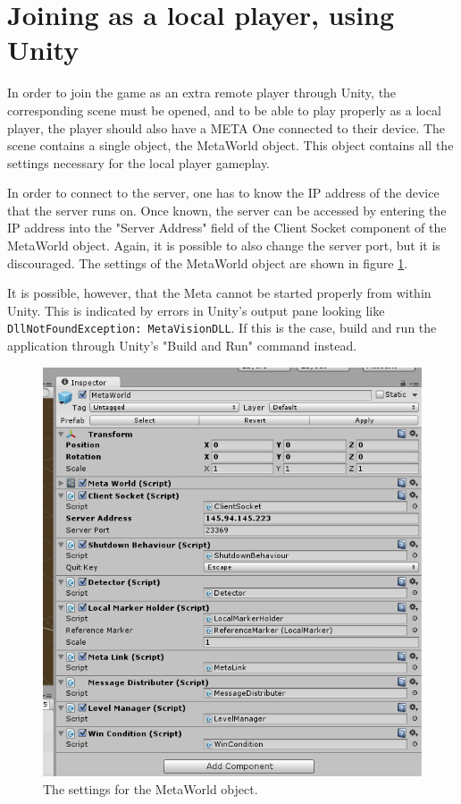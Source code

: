 \documentclass{report}
\begin{document}
\section*{Joining as a local player, using Unity}
	In order to join the game as an extra remote player through Unity, the 
	corresponding scene must be opened, and to be able
	to play properly as a local player, the player should also have a META One
	connected to their device. The scene contains a single object, the MetaWorld object. This object
	contains all the settings necessary for the local player gameplay.
	
	In order to connect to the server, one has to know the IP address of the
	device that the server runs on. Once known, the server can be accessed by
	entering the IP address into the "Server Address" field of the Client Socket
	component of the MetaWorld object. Again, it is possible to also change the
	server port, but it is discouraged. The settings of the MetaWorld object
	are shown in figure \ref{fig:metaworld}.
	
	It is possible, however, that the Meta cannot be started properly from within Unity.
	This is indicated by errors in Unity's output pane looking like 
	\texttt{DllNotFoundException: MetaVisionDLL}. If this is the case, build and run the 
	application through Unity's "Build and Run" command instead.
	
	\begin{figure}[!ht]
	    \centering
	    \includegraphics[scale = 0.6]{MetaWorld}
	    \caption{The settings for the MetaWorld object.}
	    \label{fig:metaworld}
	\end{figure}
\end{document}
